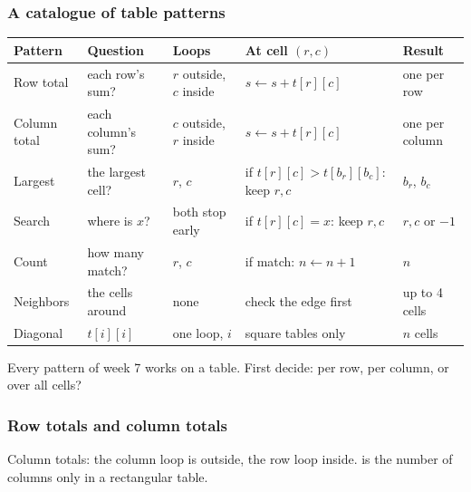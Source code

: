 \documentclass[aspectratio=169,10pt,compress]{beamer}
\begin{document}
\begin{frame}[t,fragile] \frametitle{A catalogue of table patterns}


\begin{table}
		\footnotesize
		\begin{tabular}{@{}L{0.12\textwidth}L{0.19\textwidth}L{0.16\textwidth}L{0.29\textwidth}L{0.12\textwidth}@{}}
			\toprule
			\textbf{Pattern} & \textbf{Question} & \textbf{Loops} & \textbf{At cell $(r, c)$} & \textbf{Result} \\
			\midrule
			Row total    & each row's sum?       & $r$ outside, $c$ inside & $s \gets s + t[r][c]$                 & one per row \\
			Column total & each column's sum?    & $c$ outside, $r$ inside & $s \gets s + t[r][c]$                 & one per column \\
			Largest      & the largest cell?     & $r$, $c$                & if $t[r][c] > t[b_{r}][b_{c}]$: keep $r, c$ & $b_{r}$, $b_{c}$ \\
			Search       & where is $x$?         & both stop early         & if $t[r][c] = x$: keep $r, c$         & $r, c$ or $-1$ \\
			Count        & how many match?       & $r$, $c$                & if match: $n \gets n + 1$             & $n$ \\
			Neighbors    & the cells around      & none                    & check the edge first                  & up to 4 cells \\
			Diagonal     & $t[i][i]$             & one loop, $i$           & square tables only                    & $n$ cells \\
			\bottomrule
		\end{tabular}
\end{table}%


	\vspace{0.3em}
	\small Every pattern of week 7 works on a table. First decide: per row, per column, or over all cells?
\end{frame}




\begin{frame}[t,fragile] \frametitle{Row totals and column totals}

	\footnotesize Column totals: the column loop is outside, the row loop inside.
	 is the number of columns only in a rectangular table.
\end{frame}
\end{document}
